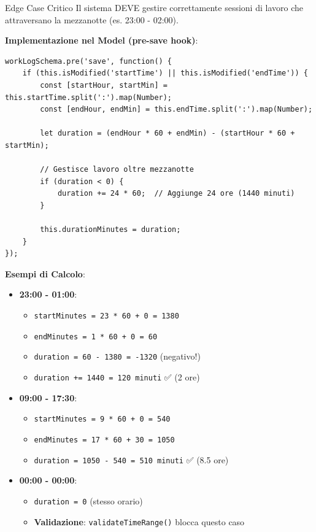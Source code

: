 \documentclass[11pt,a4paper]{article}
\begin{document}
\begin{importantbox}{Edge Case Critico}
Il sistema DEVE gestire correttamente sessioni di lavoro che attraversano la mezzanotte (es. 23:00 - 02:00).
\end{importantbox}

\textbf{Implementazione nel Model (pre-save hook)}:
\begin{lstlisting}
workLogSchema.pre('save', function() {
    if (this.isModified('startTime') || this.isModified('endTime')) {
        const [startHour, startMin] = this.startTime.split(':').map(Number);
        const [endHour, endMin] = this.endTime.split(':').map(Number);
        
        let duration = (endHour * 60 + endMin) - (startHour * 60 + startMin);
        
        // Gestisce lavoro oltre mezzanotte
        if (duration < 0) {
            duration += 24 * 60;  // Aggiunge 24 ore (1440 minuti)
        }
        
        this.durationMinutes = duration;
    }
});
\end{lstlisting}

\textbf{Esempi di Calcolo}:
\begin{itemize}
    \item \textbf{23:00 - 01:00}: 
    \begin{itemize}
        \item \texttt{startMinutes = 23 * 60 + 0 = 1380}
        \item \texttt{endMinutes = 1 * 60 + 0 = 60}
        \item \texttt{duration = 60 - 1380 = -1320} (negativo!)
        \item \texttt{duration += 1440 = 120 minuti} ✅ (2 ore)
    \end{itemize}
    
    \item \textbf{09:00 - 17:30}:
    \begin{itemize}
        \item \texttt{startMinutes = 9 * 60 + 0 = 540}
        \item \texttt{endMinutes = 17 * 60 + 30 = 1050}
        \item \texttt{duration = 1050 - 540 = 510 minuti} ✅ (8.5 ore)
    \end{itemize}
    
    \item \textbf{00:00 - 00:00}:
    \begin{itemize}
        \item \texttt{duration = 0} (stesso orario)
        \item \textbf{Validazione}: \texttt{validateTimeRange()} blocca questo caso
    \end{itemize}
\end{itemize}
\end{document}

